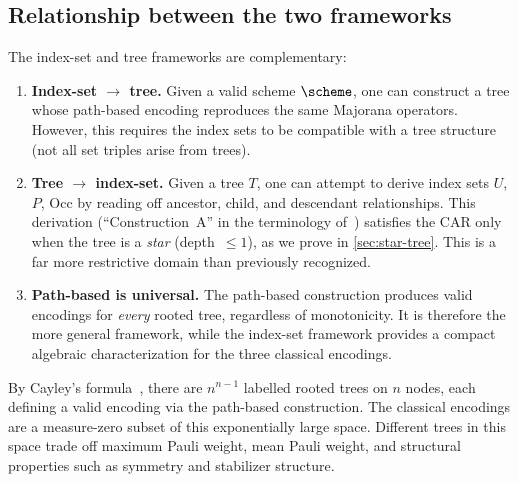 \subsection{Relationship between the two frameworks}

The index-set and tree frameworks are complementary:

\begin{enumerate}
  \item \textbf{Index-set $\to$ tree.}  Given a valid scheme
    $\scheme$, one can construct a tree whose path-based encoding
    reproduces the same Majorana operators.  However, this requires
    the index sets to be compatible with a tree structure (not all
    set triples arise from trees).

  \item \textbf{Tree $\to$ index-set.}  Given a tree $T$, one can
    attempt to derive index sets $U$, $P$, $\mathrm{Occ}$ by
    reading off ancestor, child, and descendant relationships.
    This derivation (``Construction~A'' in the terminology
    of~\cite{seeley2012}) satisfies the CAR only when the tree is a
    \emph{star} (depth~$\le 1$), as we prove in \cref{sec:star-tree}.
    This is a far more restrictive domain than previously recognized.

  \item \textbf{Path-based is universal.}  The path-based construction
    produces valid encodings for \emph{every} rooted tree, regardless of
    monotonicity.  It is therefore the more general framework, while the
    index-set framework provides a compact algebraic characterization
    for the three classical encodings.
\end{enumerate}

\begin{remark}
By Cayley's formula~\cite{cayley1889}, there are $n^{n-1}$ labelled
rooted trees on $n$ nodes, each defining a valid encoding via the
path-based construction.  The classical encodings are a measure-zero
subset of this exponentially large space.  Different trees in this space
trade off maximum Pauli weight, mean Pauli weight, and structural
properties such as symmetry and stabilizer structure.
\end{remark}
